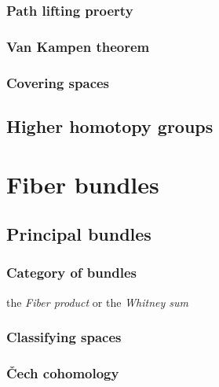 \documentclass{../../large}
\begin{document}
\section{Path lifting proerty}

\section{Van Kampen theorem}

\section{Covering spaces}


\chapter{Higher homotopy groups}
\chapter{}







\part{Fiber bundles}
\chapter{Principal bundles}

\section{Category of bundles}
\begin{prb}
\end{prb}

\begin{prb}
the \emph{Fiber product} or the \emph{Whitney sum}
\end{prb}



\section{Classifying spaces}

\section{\v Cech cohomology}
\end{document}
